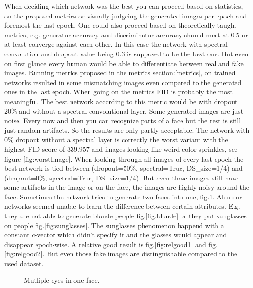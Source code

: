 \documentclass[12pt, a4paper]{article}
\begin{document}
When deciding which network was the best you can proceed based on statistics, on the proposed metrics or visually judgeing the generated images per epoch and foremost the last epoch. 
One could also proceed based on theoretically taught metrics, e.g. generator accuracy and discriminator accuracy should meet at 0.5 or at least converge against each other. In this case the network with spectral convolution and dropout value being 0.3 is supposed to be the best one. But even on first glance every human would be able to differentiate between real and fake images. 
Running metrics proposed in the metrics section:\ref{metrics}, on trained networks resulted in some mismatching images even compared to the generated ones in the last epoch. When going on the metrics FID is probably the most meaningful. The best network according to this metric would be with dropout 20\% and without a spectral convolutional layer. Some generated images are just noise. Every now and then you can recognize parts of a face but the rest is still just random artifacts. So the results are only partly acceptable. The network with 0\% dropout without a spectral layer is correctly the worst variant with the highest FID score of 339.957 and images looking like weird color sprinkles, see figure \ref{fig:worstImage}.
When looking through all images of every last epoch the best network is tied between (dropout=50\%, spectral=True, DS\_size=1/4) and (dropout=0\%, spectral=True, DS\_size=1/4). But even these images still have some artifacts in the image or on the face, the images are highly noisy around the face. 
Sometimes the network tries to generate two faces into one, fig.\ref{fig:twoFacesInOne}. 
Also our networks seemed unable to learn the difference between certain attributes. 
E.g. they are not able to generate blonde people fig.\ref{fig:blonde} or they put sunglasses on people fig.\ref{fig:sunglasses}. The sunglasses phenomenon happend with a constant c-vector which didn't specify it and the glasses would appear and disappear epoch-wise.
A relative good result is fig.\ref{fig:relgood1} and fig.\ref{fig:relgood2}. But even those fake images are distinguishable compared to the used dataset.
\begin{figure}
    \caption{Mutliple eyes in one face.}
    \label{fig:twoFacesInOne}
\end{figure}
\end{document}
